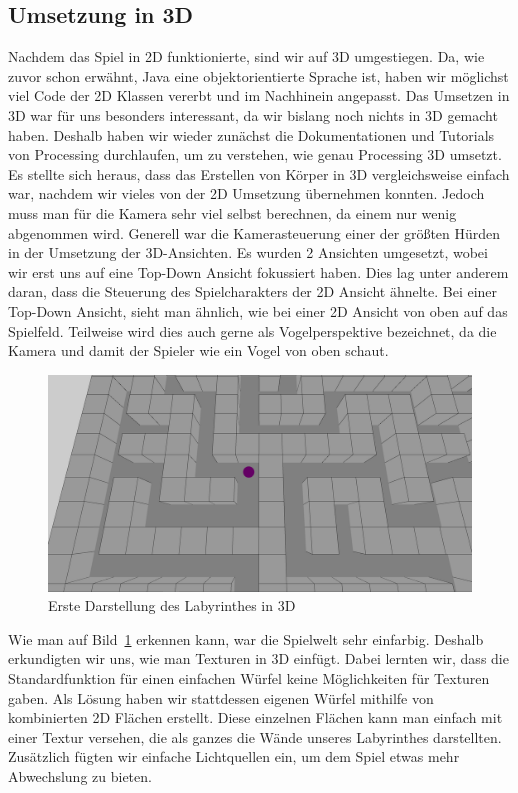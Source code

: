 \subsection{Umsetzung in 3D}\label{subsec:umsetzung-in-3D}
Nachdem das Spiel in 2D funktionierte, sind wir auf 3D umgestiegen. Da, wie zuvor schon erwähnt, Java eine objektorientierte Sprache ist, haben wir möglichst viel Code der 2D Klassen vererbt und im Nachhinein angepasst.
Das Umsetzen in 3D war für uns besonders interessant, da wir bislang noch nichts in 3D gemacht haben. Deshalb haben wir wieder zunächst die Dokumentationen und Tutorials von Processing durchlaufen, um zu verstehen, wie genau Processing 3D umsetzt. Es stellte sich heraus, dass das Erstellen von Körper in 3D vergleichsweise einfach war, nachdem wir vieles von der 2D Umsetzung übernehmen konnten. Jedoch muss man für die Kamera sehr viel selbst berechnen, da einem nur wenig abgenommen wird. Generell war die Kamerasteuerung einer der größten Hürden in der Umsetzung der 3D-Ansichten.
Es wurden 2 Ansichten umgesetzt, wobei wir erst uns auf eine Top-Down Ansicht fokussiert haben. Dies lag unter anderem daran, dass die Steuerung des Spielcharakters der 2D Ansicht ähnelte. Bei einer Top-Down Ansicht, sieht man ähnlich, wie bei einer 2D Ansicht von oben auf das Spielfeld. Teilweise wird dies auch gerne als Vogelperspektive bezeichnet, da die Kamera und damit der Spieler wie ein Vogel von oben schaut.

\begin{figure}[hbtp!]
    \centering
    \includegraphics[width=\paperwidth-3in]{../assets/img/Fr3DTopDown.PNG}
    \caption{Erste Darstellung des Labyrinthes in 3D}
    \label{fig:Fr3DTopDown}
\end{figure}

Wie man auf Bild~\ref{fig:Fr3DTopDown} erkennen kann, war die Spielwelt sehr einfarbig. Deshalb erkundigten wir uns, wie man Texturen in 3D einfügt. Dabei lernten wir, dass die Standardfunktion für einen einfachen Würfel keine Möglichkeiten für Texturen gaben. Als Lösung haben wir stattdessen eigenen Würfel mithilfe von kombinierten 2D Flächen erstellt. Diese einzelnen Flächen kann man einfach mit einer Textur versehen, die als ganzes die Wände unseres Labyrinthes darstellten. Zusätzlich fügten wir einfache Lichtquellen ein, um dem Spiel etwas mehr Abwechslung zu bieten.


